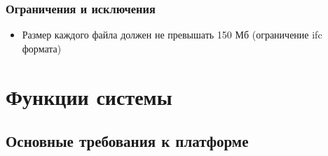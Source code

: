 \documentclass[a4paper,14pt]{extreport} %
\begin{document}
\subsection{Ограничения и исключения}

\begin{itemize}
\item Размер каждого файла должен не превышать 150 Мб (ограничение ifc формата)
\end {itemize}

\newpage

\chapter{Функции системы}
\section{Основные требования к платформе}
\end{document}
